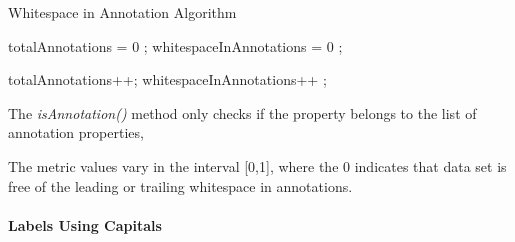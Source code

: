 \begin{algorithm}
\caption{Whitespace in Annotation Algorithm}\label{lst:whitespace}
\begin{algorithmic}[1]
\State totalAnnotations = 0 ;
\State whitespaceInAnnotations = 0 ;
\EndProcedure

 totalAnnotations++; \EndIf
{} whitespaceInAnnotations++ ; \EndIf
{}
\EndProcedure
\end{algorithmic}
\end{algorithm}

The \textit{isAnnotation()} method  only checks if the property belongs to the list of annotation properties, 

The metric values vary in the interval [0,1], where  the 0 indicates that data set is free of the leading or trailing whitespace in annotations.


\paragraph{Labels Using Capitals}

